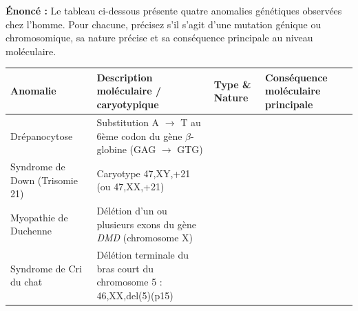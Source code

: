 \documentclass[11pt]{article}
\begin{document}
\begin{exoresolu}
    \textbf{Énoncé :} Le tableau ci-dessous présente quatre anomalies génétiques observées chez l'homme. Pour chacune, précisez s'il s'agit d'une mutation génique ou chromosomique, sa nature précise et sa conséquence principale au niveau moléculaire.
    \begin{center}
    \begin{tabularx}{\linewidth}{|l|X|X|X|}\hline
    \rowcolor{popblueL}
    \textbf{Anomalie} & \textbf{Description moléculaire / caryotypique} & \textbf{Type \& Nature} & \textbf{Conséquence moléculaire principale} \\ \hline
    Drépanocytose & Substitution A $\rightarrow$ T au 6ème codon du gène $\beta$-globine (GAG $\rightarrow$ GTG) & & \\ \hline
    Syndrome de Down (Trisomie 21) & Caryotype 47,XY,+21 (ou 47,XX,+21) & & \\ \hline
    Myopathie de Duchenne & Délétion d'un ou plusieurs exons du gène \emph{DMD} (chromosome X) & & \\ \hline
    Syndrome de Cri du chat & Délétion terminale du bras court du chromosome 5 : 46,XX,del(5)(p15) & & \\ \hline
    \end{tabularx}
    \end{center}


\end{exoresolu}
\end{document}

